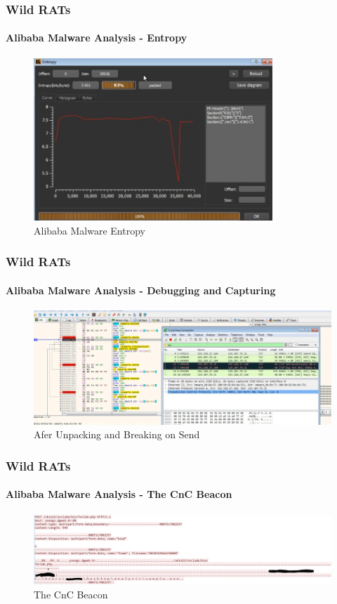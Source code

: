\documentclass[aspectratio=169]{beamer}
\begin{document}
\begin{frame}
  \frametitle{Wild RATs}
  \framesubtitle{Alibaba Malware Analysis - Entropy}
  \begin{center}
    \begin{figure}
      \includegraphics[width=9cm,keepaspectratio]{alibaba_die_entropy}
      \caption{Alibaba Malware Entropy}
    \end{figure}
  \end{center}
\end{frame}

\begin{frame}
  \frametitle{Wild RATs}
  \framesubtitle{Alibaba Malware Analysis - Debugging and Capturing}
  \begin{center}
    \begin{figure}
      \includegraphics[width=14cm,keepaspectratio]{alibaba_cnc}
      \caption{Afer Unpacking and Breaking on Send}
    \end{figure}
  \end{center}
\end{frame}

\begin{frame}
  \frametitle{Wild RATs}
  \framesubtitle{Alibaba Malware Analysis - The CnC Beacon}
  \begin{center}
    \begin{figure}
      \includegraphics[width=14cm,keepaspectratio]{alibaba_http}
      \caption{The CnC Beacon}
    \end{figure}
  \end{center}
\end{frame}
\end{document}
